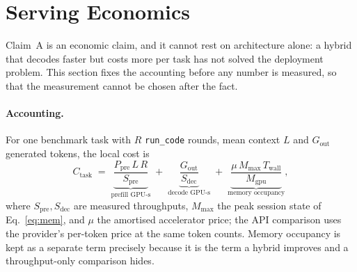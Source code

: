 ﻿\section{Serving Economics}\label{sec:econ}

Claim~A is an economic claim, and it cannot rest on architecture alone: a hybrid that decodes faster but costs more per task has not solved the deployment problem.
This section fixes the accounting before any number is measured, so that the measurement cannot be chosen after the fact.

\paragraph{Accounting.}
For one benchmark task with $R$ \texttt{run\_code} rounds, mean context $L$ and $G_{\mathrm{out}}$ generated tokens, the local cost is
\begin{equation}
C_{\text{task}} \;=\; \underbrace{\frac{P_{\text{pre}}\,L\,R}{S_{\text{pre}}}}_{\text{prefill GPU-s}}
\;+\; \underbrace{\frac{G_{\mathrm{out}}}{S_{\text{dec}}}}_{\text{decode GPU-s}}
\;+\; \underbrace{\frac{\mu\,M_{\max}\,T_{\text{wall}}}{M_{\text{gpu}}}}_{\text{memory occupancy}},
\label{eq:cost}
\end{equation}
where $S_{\text{pre}},S_{\text{dec}}$ are measured throughputs, $M_{\max}$ the peak session state of Eq.~\ref{eq:mem}, and $\mu$ the amortised accelerator price; the API comparison uses the provider's per-token price at the same token counts.
Memory occupancy is kept as a separate term precisely because it is the term a hybrid improves and a throughput-only comparison hides.

